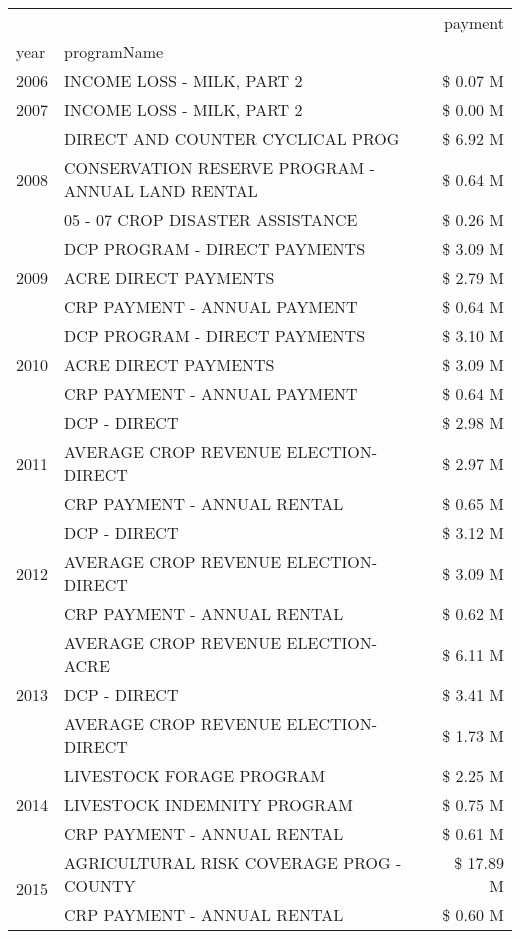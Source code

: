 \begin{tabular}{llr}
\toprule
 &  & payment \\
year & programName &  \\
\midrule
2006 & INCOME LOSS - MILK, PART 2 & \$ 0.07 M \\
\cline{1-3}
2007 & INCOME LOSS - MILK, PART 2 & \$ 0.00 M \\
\cline{1-3}
\multirow[t]{3}{*}{2008} & DIRECT AND COUNTER CYCLICAL PROG & \$ 6.92 M \\
 & CONSERVATION RESERVE PROGRAM - ANNUAL LAND RENTAL & \$ 0.64 M \\
 & 05 - 07 CROP DISASTER ASSISTANCE & \$ 0.26 M \\
\cline{1-3}
\multirow[t]{3}{*}{2009} & DCP PROGRAM - DIRECT PAYMENTS & \$ 3.09 M \\
 & ACRE DIRECT PAYMENTS & \$ 2.79 M \\
 & CRP PAYMENT - ANNUAL PAYMENT & \$ 0.64 M \\
\cline{1-3}
\multirow[t]{3}{*}{2010} & DCP PROGRAM - DIRECT PAYMENTS & \$ 3.10 M \\
 & ACRE DIRECT PAYMENTS & \$ 3.09 M \\
 & CRP PAYMENT - ANNUAL PAYMENT & \$ 0.64 M \\
\cline{1-3}
\multirow[t]{3}{*}{2011} & DCP - DIRECT & \$ 2.98 M \\
 & AVERAGE CROP REVENUE ELECTION-DIRECT & \$ 2.97 M \\
 & CRP PAYMENT - ANNUAL RENTAL & \$ 0.65 M \\
\cline{1-3}
\multirow[t]{3}{*}{2012} & DCP - DIRECT & \$ 3.12 M \\
 & AVERAGE CROP REVENUE ELECTION-DIRECT & \$ 3.09 M \\
 & CRP PAYMENT - ANNUAL RENTAL & \$ 0.62 M \\
\cline{1-3}
\multirow[t]{3}{*}{2013} & AVERAGE CROP REVENUE ELECTION-ACRE & \$ 6.11 M \\
 & DCP - DIRECT & \$ 3.41 M \\
 & AVERAGE CROP REVENUE ELECTION-DIRECT & \$ 1.73 M \\
\cline{1-3}
\multirow[t]{3}{*}{2014} & LIVESTOCK FORAGE PROGRAM & \$ 2.25 M \\
 & LIVESTOCK INDEMNITY PROGRAM & \$ 0.75 M \\
 & CRP PAYMENT - ANNUAL RENTAL & \$ 0.61 M \\
\cline{1-3}
\multirow[t]{3}{*}{2015} & AGRICULTURAL RISK COVERAGE PROG - COUNTY & \$ 17.89 M \\
 & CRP PAYMENT - ANNUAL RENTAL & \$ 0.60 M \\

\end{tabular}
